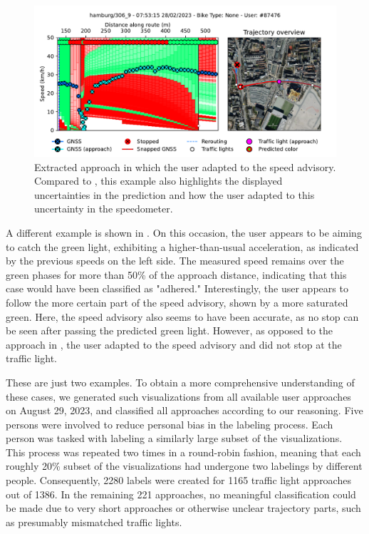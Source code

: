 \begin{figure}[t]
\caption{Extracted approach in which the user adapted to the speed advisory. Compared to , this example also highlights the displayed uncertainties in the prediction and how the user adapted to this uncertainty in the speedometer.}\label{fig:example-trajectory-adapted}
\includegraphics[width=\linewidth]{images/example-trajectory-adapted.pdf}
\end{figure}

A different example is shown in . On this occasion, the user appears to be aiming to catch the green light, exhibiting a higher-than-usual acceleration, as indicated by the previous speeds on the left side. The measured speed remains over the green phases for more than 50\% of the approach distance, indicating that this case would have been classified as "adhered." Interestingly, the user appears to follow the more certain part of the speed advisory, shown by a more saturated green. Here, the speed advisory also seems to have been accurate, as no stop can be seen after passing the predicted green light. However, as opposed to the approach in , the user adapted to the speed advisory and did not stop at the traffic light.

These are just two examples. To obtain a more comprehensive understanding of these cases, we generated such visualizations from all available user approaches on August 29, 2023, and classified all approaches according to our reasoning. Five persons were involved to reduce personal bias in the labeling process. Each person was tasked with labeling a similarly large subset of the visualizations. This process was repeated two times in a round-robin fashion, meaning that each roughly 20\% subset of the visualizations had undergone two labelings by different people. Consequently, 2280 labels were created for 1165 traffic light approaches out of 1386. In the remaining 221 approaches, no meaningful classification could be made due to very short approaches or otherwise unclear trajectory parts, such as presumably mismatched traffic lights. 

